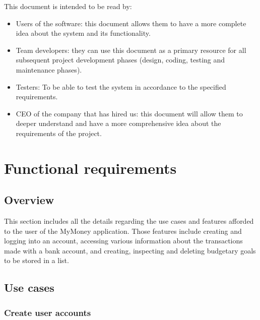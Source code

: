 \documentclass[letterpaper]{article}
\begin{document}
		This document is intended to be read by:
		
		\begin{itemize}
			
			\item Users of the software: this document allows them to have a more complete idea about the system and its functionality.
			
			\item Team developers: they can use this document as a primary resource for all subsequent project development phases (design, coding, testing and maintenance phases).
			
			\item Testers: To be able to test the system in accordance to the specified requirements.
			
			\item CEO of the company that has hired us: this document will allow them to deeper understand and have a more comprehensive idea about the requirements of the project.
			
		\end{itemize}

\newpage

\section{Functional requirements}

	\subsection{Overview}
	
		This section includes all the details regarding the use cases and features afforded to the user of the MyMoney application. Those features include creating and logging into an account, accessing various information about the transactions made with a bank account, and creating, inspecting and deleting budgetary goals to be stored in a list.
	
	\subsection{Use cases}
	
		\subsubsection{Create user accounts}
		
\end{document}
